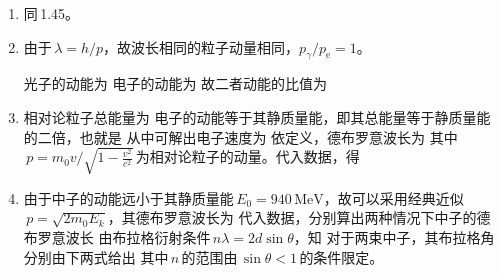 \begin{enumerate}[label=1.\arabic*, leftmargin=-0.5mm]
\item 同\,1.45。

\item
由于$\,\lambda=h/p$，故波长相同的粒子动量相同，$p_\gamma/p_{\mathrm{e}}=1$。\par
光子的动能为
电子的动能为
故二者动能的比值为

\item
相对论粒子总能量为
电子的动能等于其静质量能，即其总能量等于静质量能的二倍，也就是
从中可解出电子速度为
依定义，德布罗意波长为
其中$\,p=m_0v/\sqrt{1-\frac{v^2}{c^2}}\,$为相对论粒子的动量。代入数据，得

\item
由于中子的动能远小于其静质量能$\,E_0=940\,\mathrm{MeV}$，故可以采用经典近似$\,p=\sqrt{2m_0E_k}$，其德布罗意波长为
代入数据，分别算出两种情况下中子的德布罗意波长
由布拉格衍射条件$\,n\lambda=2d\sin\theta$，知
对于两束中子，其布拉格角分别由下两式给出
其中$\,n\,$的范围由$\,\sin\theta<1\,$的条件限定。


\end{enumerate}
